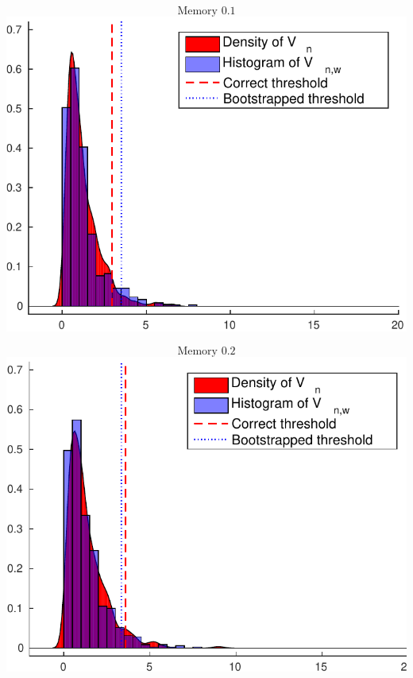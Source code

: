 \documentclass[landscape,a0]{a0poster_csml_v2}
\begin{document}
\begin{poster}
\begin{PosterColumn}
\end{PosterColumn}
\begin{PosterColumn}



\begin{minipage}[c]{0.24\textwidth} $$\text{Memory } 0.1$$
\includegraphics[width=\textwidth]{../img/wild_ecdf1.pdf} 
\end{minipage}
\begin{minipage}[c]{0.24\textwidth} $$\text{Memory } 0.2$$
\includegraphics[width=\textwidth]{../img/wild_ecdf2.pdf} 
\end{minipage}

\end{PosterColumn}
\end{poster}
\end{document}
